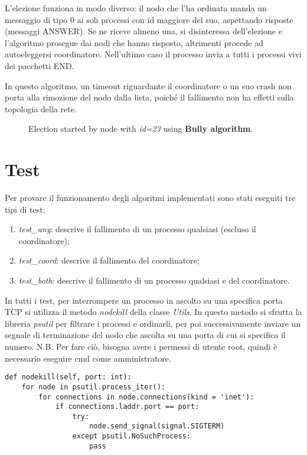 \documentclass[conference]{IEEEtran}
\begin{document}
L'elezione funziona in modo diverso: il nodo che l'ha ordinata manda un messaggio di tipo 0 ai soli processi con id maggiore del suo, aspettando risposte (messaggi ANSWER).
Se ne riceve almeno una, si disinteressa dell'elezione e l'algoritmo prosegue dai nodi che hanno risposto, altrimenti procede ad autoeleggersi coordinatore.
Nell'ultimo caso il processo invia a tutti i processi vivi dei pacchetti END.

In questo algoritmo, un timeout riguardante il coordinatore o un suo crash non porta alla rimozione del nodo dalla lista, poiché il fallimento non ha effetti sulla topologia della rete.

\begin{figure}[htbp]
  \centering
  
  \caption{Election started by node with \textit{id=23} using \textbf{Bully algorithm}.}
\end{figure}


\section{Test}\label{sec:tests}

Per provare il funzionamento degli algoritmi implementati sono stati eseguiti tre tipi di test:

\begin{enumerate}
    \item \textit{test\_any}: descrive il fallimento di un processo qualsiasi (escluso il coordinatore);
    \item \textit{test\_coord}: descrive il fallimento del coordinatore;
    \item \textit{test\_both}: descrive il fallimento di un processo qualsiasi e del coordinatore.
\end{enumerate}

In tutti i test, per interrompere un processo in ascolto su una specifica porta TCP si utilizza il metodo \textit{nodekill} della classe \textit{Utils}.
In questo metodo si sfrutta la libreria \textit{psutil} per filtrare i processi e ordinarli, per poi successivamente inviare un segnale di terminazione del nodo che ascolta su una porta di cui si specifica il numero.
N.B. Per fare ciò, bisogna avere i permessi di utente root, quindi è necessario eseguire cmd come amministratore.

\begin{lstlisting}
def nodekill(self, port: int):
    for node in psutil.process_iter():
        for connections in node.connections(kind = 'inet'):
            if connections.laddr.port == port:
                try:
                    node.send_signal(signal.SIGTERM)
                except psutil.NoSuchProcess:
                    pass
\end{lstlisting}
\end{document}
